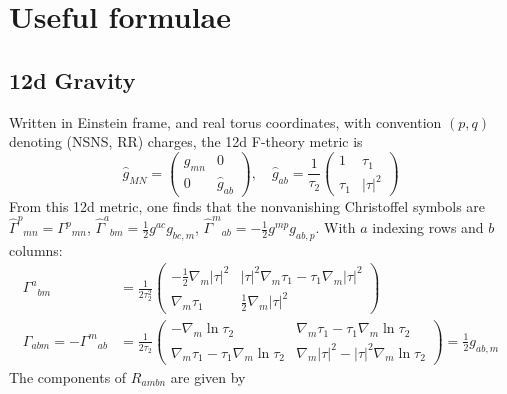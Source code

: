 

\section{Useful formulae}

\subsection{12d Gravity}
Written in Einstein frame, and real torus coordinates, with convention $(p,q)$ denoting (NSNS, RR) charges, the 12d F-theory metric is
\begin{equation}
\hat{g}_{MN}
= \begin{pmatrix}
    g_{mn} & 0 \\
    0 & \hat{g}_{ab}
\end{pmatrix},\quad
\hat{g}_{ab}
= \frac{1}{\tau_2}
\begin{pmatrix}
    1 & \tau_1 \\
    \tau_1 & |\tau|^2    
\end{pmatrix}
\end{equation}
From this 12d metric, one finds that the nonvanishing Christoffel symbols are $\hat{\Gamma}^p{}_{mn} = \Gamma^p{}_{mn}$, $\hat{\Gamma}^a{}_{bm} = \frac{1}{2}g^{ac}g_{bc,m}$, $\hat{\Gamma}^m{}_{ab} = - \frac{1}{2}g^{mp}g_{ab,p}$.
With $a$ indexing rows and $b$ columns:
\begin{equation}
\begin{aligned}
\Gamma^a{}_{bm}
&=\frac{1}{2 \tau_2^2}\begin{pmatrix}
    -\tfrac12 \nabla_m|\tau|^2 & |\tau|^2\nabla_m\tau_1 - \tau_1 \nabla_m|\tau|^2 \\
    \nabla_m\tau_1 & \tfrac12 \nabla_m|\tau|^2
\end{pmatrix}\\
\Gamma_{abm}=-\Gamma^m{}_{ab}
&= \frac{1}{2\tau_2}\begin{pmatrix}
    -\nabla_m\ln\tau_2
    & \nabla_m\tau_1 - \tau_1\nabla_m\ln\tau_2 \\
    \nabla_m\tau_1 - \tau_1\nabla_m\ln\tau_2 & \nabla_m|\tau|^2 - |\tau|^2\nabla_m\ln\tau_2
\end{pmatrix}
=\frac{1}{2}g_{ab,m}
\end{aligned}
\end{equation}
The components of $R_{ambn}$ are given by

